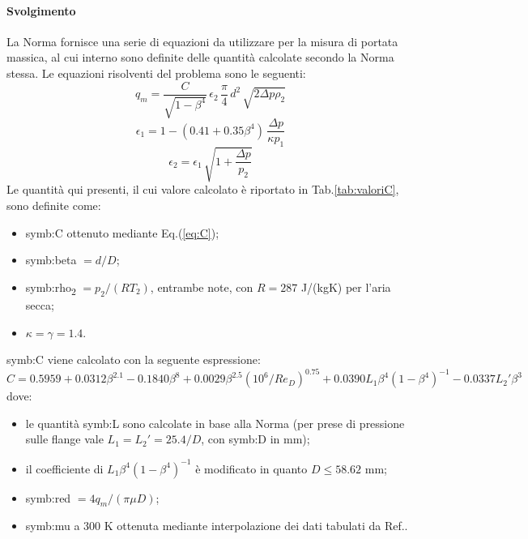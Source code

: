 \paragraph{Svolgimento}
La Norma fornisce una serie di equazioni da utilizzare per la misura di portata massica, al cui interno sono definite delle quantità calcolate secondo la Norma stessa. Le equazioni risolventi del problema sono le seguenti:
\begin{equation}
	q_m=\frac{C}{\sqrt{1-\beta^4}}\, \epsilon_2 \,\frac{\pi}{4} \, d^2 \, \sqrt{2\Delta p \rho_2} \label{eq:portatamassica}
\end{equation}
\begin{equation}
	\epsilon_1= 1 - (0.41+0.35\beta^4) \, \frac{\Delta p}{\kappa p_1} \label{eq:epsilon1}
\end{equation}
\begin{equation}
	\epsilon_2=\epsilon_1 \, \sqrt{1+\frac{\Delta p}{p_2}} \label{eq:epsilon2}
\end{equation}
Le quantità qui presenti, il cui valore calcolato è riportato in Tab.\ref{tab:valoriC}, sono definite come:
\begin{itemize}
	\item \gls{symb:C} ottenuto mediante Eq.(\ref{eq:C});
	\item \gls{symb:beta} $ = d/D$;
	\item \gls{symb:rho}\textsubscript{2} $= p_2 / (RT_2) $, entrambe note, con $ R = 287 $ J/(kgK) per l'aria secca;
	\item $\kappa = \gamma = 1.4 $.
\end{itemize}
\gls{symb:C} viene calcolato con la seguente espressione:
\begin{equation}
	C=0.5959+0.0312\beta^{2.1}-0.1840\beta^8+0.0029\beta^{2.5} (10^6/Re_D)^{0.75}+0.0390L_1\beta^4(1-\beta^4)^{-1}-0.0337L_2'\beta^3 \label{eq:C}
\end{equation}
dove:
\begin{itemize}
	\item le quantità \gls{symb:L} sono calcolate in base alla Norma (per prese di pressione sulle flange vale $L_1=L_2'=25.4/D$, con \gls{symb:D} in mm);
	\item il coefficiente di $L_1\beta^4(1-\beta^4)^{-1}$ è modificato in quanto $D\leqslant58.62$ mm;
	\item \gls{symb:red} $=4q_m/(\pi \mu D)$;
	\item \gls{symb:mu} a 300 K ottenuta mediante interpolazione dei dati tabulati da Ref.\cite{Cengel}. 
\end{itemize} 
